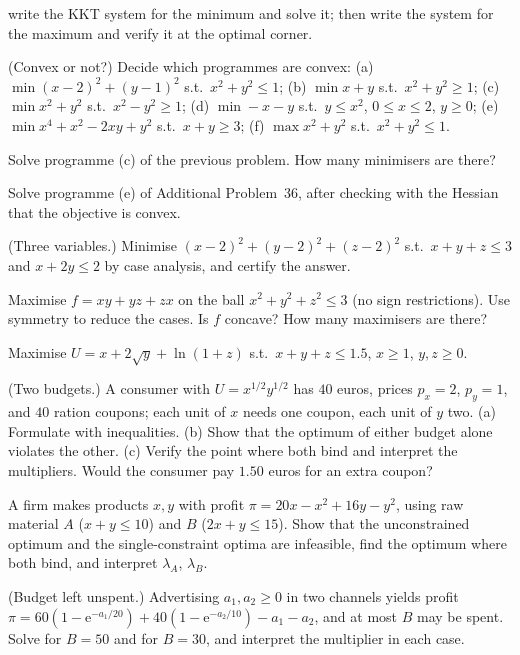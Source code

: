 \begin{problems}
        write the KKT system for the minimum and solve it; then write the
        system for the maximum and verify it at the optimal corner.
  \item (Convex or not?) Decide which programmes are convex:
        (a) $\min(x-2)^{2}+(y-1)^{2}$ s.t.\ $x^{2}+y^{2}\le1$;
        (b) $\min x+y$ s.t.\ $x^{2}+y^{2}\ge1$;
        (c) $\min x^{2}+y^{2}$ s.t.\ $x^{2}-y^{2}\ge1$;
        (d) $\min -x-y$ s.t.\ $y\le x^{2}$, $0\le x\le2$, $y\ge0$;
        (e) $\min x^{4}+x^{2}-2xy+y^{2}$ s.t.\ $x+y\ge3$;
        (f) $\max x^{2}+y^{2}$ s.t.\ $x^{2}+y^{2}\le1$.
  \item Solve programme (c) of the previous problem. How many minimisers
        are there?
  \item Solve programme (e) of Additional Problem~36, after checking with
        the Hessian that the objective is convex.
  \item (Three variables.) Minimise $(x-2)^{2}+(y-2)^{2}+(z-2)^{2}$ s.t.\
        $x+y+z\le3$ and $x+2y\le2$ by case analysis, and certify the
        answer.
  \item Maximise $f=xy+yz+zx$ on the ball $x^{2}+y^{2}+z^{2}\le3$ (no sign
        restrictions). Use symmetry to reduce the cases. Is $f$ concave?
        How many maximisers are there?
  \item Maximise $U=x+2\sqrt{y}+\ln(1+z)$ s.t.\ $x+y+z\le1.5$, $x\ge1$,
        $y,z\ge0$.
  \item (Two budgets.) A consumer with $U=x^{1/2}y^{1/2}$ has $40$ euros,
        prices $p_x=2$, $p_y=1$, and $40$ ration coupons; each unit of $x$
        needs one coupon, each unit of $y$ two. (a) Formulate with
        inequalities. (b) Show that the optimum of either budget alone
        violates the other. (c) Verify the point where both bind and
        interpret the multipliers. Would the consumer pay $1.50$ euros for an
        extra coupon?
  \item A firm makes products $x,y$ with profit
        $\pi=20x-x^{2}+16y-y^{2}$, using raw material $A$ ($x+y\le10$) and
        $B$ ($2x+y\le15$). Show that the unconstrained optimum and the
        single-constraint optima are infeasible, find the optimum where both
        bind, and interpret $\lambda_A$, $\lambda_B$.
  \item (Budget left unspent.) Advertising $a_1,a_2\ge0$ in two channels
        yields profit
        $\pi=60(1-\mathrm{e}^{-a_1/20})+40(1-\mathrm{e}^{-a_2/10})-a_1-a_2$,
        and at most $B$ may be spent. Solve for $B=50$ and for $B=30$, and
        interpret the multiplier in each case.

\end{problems}
